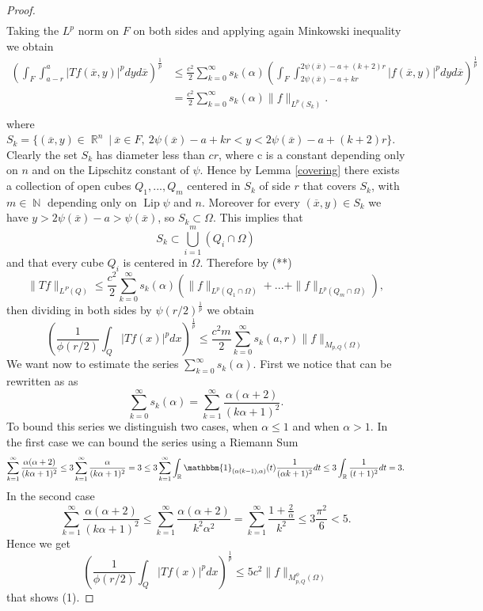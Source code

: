 \documentclass[12pt]{article}
\theoremstyle{definition}
\DeclareMathOperator\Lip{Lip}
\DeclareMathOperator\rr{\mathbb{R}}
\DeclareMathOperator\nn{\mathbb{N}}
\begin{document}
\begin{proof}
\begin{align*}
\end{align*}
Taking the $L^p$ norm on $F$ on both sides and applying again Minkowski inequality we obtain
\begin{align*}
\left(\int_F\int_{a-r}^{a}|Tf(\overline x,y)|^p dy d\overline x\right)^{\frac{1}{p}} &\le \frac{c^2}{2} \sum_{k=0}^\infty s_k(\alpha) \left (\int_F \int_{2\psi(\overline x) -a+kr}^{2\psi(\overline x) -a+(k+2)r}|f(\overline x, y)|^p  dy d\overline x\right) ^{\frac{1}{p}}\\
&= \frac{c^2}{2} \sum_{k=0}^\infty s_k(\alpha) \|f\|_{L^p(S_k)}. \tag{**}\\
\end{align*}
where $S_k=\{ (\overline x, y) \in \rr^n \ | \ \overline x \in F ,\  2\psi(\overline x) -a+kr < y < 2\psi(\overline x) -a+(k+2)r \}$. Clearly the set $S_k$ has diameter less than $cr$, where c is a constant depending only on $n$ and on the Lipschitz constant of $\psi$. Hence by Lemma \ref{covering} there exists a collection of open cubes $Q_1,...,Q_m$ centered in $S_k$ of side $r$ that covers $S_k$, with $m \in \nn$ depending only on $\Lip \psi$ and $n$. Moreover for every $(\overline x, y ) \in S_k$ we have $y>2\psi(\overline x)-a>\psi(\overline x)$, so $S_k \subset \Omega$. This implies that
\[ S_k \subset \bigcup_{i=1}^m (Q_i\cap \Omega) \]
and that every cube $Q_i$ is centered in $\Omega.$ Therefore by (**) 
\[ \| Tf\|_{L^P(Q)} \le \frac{c^2}{2}\sum_{k=0}^\infty s_k(\alpha) (\|f\|_{L^p(Q_1\cap \Omega)}+...+\|f\|_{L^p(Q_m\cap \Omega)}),\]
 then dividing in both sides by $\psi(r/2)^{\frac{1}{p}}$ we obtain
\[\left(\frac{1}{\phi(r/2)}\int_Q|Tf(x)|^p dx\right)^{\frac{1}{p}} \le \frac{c^2m}{2} \sum_{k=0}^\infty s_k(a,r) \| f\|_{M_{p,Q}(\Omega)} \]
We want now to estimate the series $\sum_{k=0}^\infty s_k(\alpha)$. First we notice that can be rewritten as as
\[\sum_{k=0}^\infty s_k(\alpha)= \sum_{k=1}^\infty \frac{\alpha(\alpha+2)}{(k\alpha+1)^2}.\]
To bound this series we distinguish two cases, when $\alpha\le 1$ and when $\alpha>1$. In the first case we can bound the series using a Riemann Sum
\[ \sum_{k=1}^\infty \frac{\alpha(\alpha+2)}{(k\alpha+1)^2} \le 3\sum_{k=1}^\infty \frac{\alpha}{(k\alpha+1)^2}=3\le 3\sum_{k=1}^\infty \int_{\rr} \mathbbm{1}_{(\alpha (k-1), \alpha)}(t) \frac{1}{(\alpha k+1)^2}dt \le 3\int_{\rr}\frac{1}{(t+1)^2}dt=3. \]
In the second case
\[  \sum_{k=1}^\infty \frac{\alpha(\alpha+2)}{(k\alpha+1)^2}  \le \sum_{k=1}^\infty \frac{\alpha(\alpha+2)}{k^2\alpha^2}=\sum_{k=1}^\infty \frac{1+\frac{2}{\alpha}}{k^2} \le 3 \frac{\pi^2}{6}<5.\]
Hence we get 
\[\left(\frac{1}{\phi(r/2)}\int_Q|Tf(x)|^p dx\right)^{\frac{1}{p}} \le 5c^2 \| f\|_{M_{p,Q}^\phi(\Omega)} \]
that shows (1). 


\end{proof}
\end{document}
